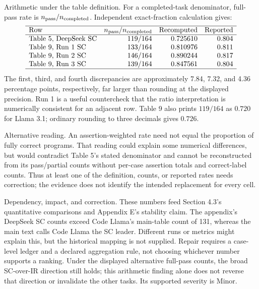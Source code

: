 \documentclass[10pt]{article}
\begin{document}
Arithmetic under the table definition. For a completed-task denominator, full-pass rate is \(n_{\rm pass}/n_{\rm completed}\). Independent exact-fraction calculation gives: \[\begin{array}{lrrr}
\hline
\text{Row}&n_{\rm pass}/n_{\rm completed}&\text{Recomputed}&\text{Reported}\\
\hline
\text{Table 5, DeepSeek SC}&119/164&0.725610&0.804\\
\text{Table 9, Run 1 SC}&133/164&0.810976&0.811\\
\text{Table 9, Run 2 SC}&146/164&0.890244&0.817\\
\text{Table 9, Run 3 SC}&139/164&0.847561&0.804\\
\hline
\end{array}\] The first, third, and fourth discrepancies are approximately 7.84, 7.32, and 4.36 percentage points, respectively, far larger than rounding at the displayed precision. Run 1 is a useful countercheck that the ratio interpretation is numerically consistent for an adjacent row. Table 9 also prints \(119/164\) as \(0.720\) for Llama 3.1; ordinary rounding to three decimals gives \(0.726\).\par
Alternative reading. An assertion-weighted rate need not equal the proportion of fully correct programs. That reading could explain some numerical differences, but would contradict Table 5’s stated denominator and cannot be reconstructed from its pass/partial counts without per-case assertion totals and correct-label counts. Thus at least one of the definition, counts, or reported rates needs correction; the evidence does not identify the intended replacement for every cell.\par
Dependency, impact, and correction. These numbers feed Section 4.3’s quantitative comparisons and Appendix E’s stability claim. The appendix’s DeepSeek SC counts exceed Code Llama’s main-table count of 131, whereas the main text calls Code Llama the SC leader. Different runs or metrics might explain this, but the historical mapping is not supplied. Repair requires a case-level ledger and a declared aggregation rule, not choosing whichever number supports a ranking. Under the displayed alternative full-pass counts, the broad SC-over-IR direction still holds; this arithmetic finding alone does not reverse that direction or invalidate the other tasks. Its supported severity is Minor.\par
\end{document}
